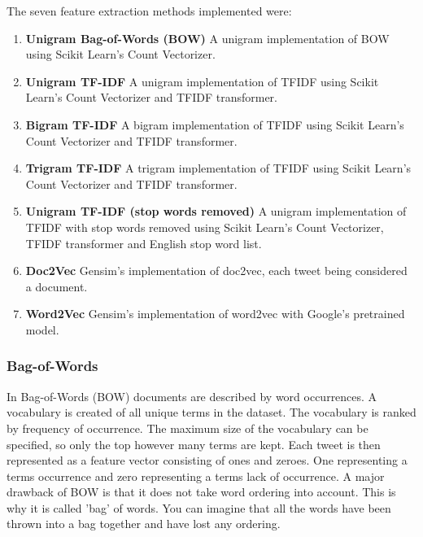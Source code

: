 The seven feature extraction methods implemented were:
\begin{enumerate}
    \item \textbf{Unigram Bag-of-Words (BOW)}\newline
    A unigram implementation of BOW using Scikit Learn's Count Vectorizer.
    \item \textbf{Unigram TF-IDF}\newline
    A unigram implementation of TFIDF using Scikit Learn's Count Vectorizer and TFIDF transformer.
    \item \textbf{Bigram TF-IDF}\newline
    A bigram implementation of TFIDF using Scikit Learn's Count Vectorizer and TFIDF transformer.
    \item \textbf{Trigram TF-IDF} \newline
    A trigram implementation of TFIDF using Scikit Learn's Count Vectorizer and TFIDF transformer.
    \item \textbf{Unigram TF-IDF (stop words removed)}\newline
    A unigram implementation of TFIDF with stop words removed using Scikit Learn's Count Vectorizer, TFIDF transformer and English stop word list.
    \item \textbf{Doc2Vec}\newline
    Gensim's implementation of doc2vec, each tweet being considered a document.
    \item \textbf{Word2Vec}\newline
    Gensim's implementation of word2vec with Google's pretrained model.
\end{enumerate}

\subsubsection{Bag-of-Words}

In Bag-of-Words (BOW) documents are described by word occurrences. A vocabulary is created of all unique terms in the dataset. The vocabulary is ranked by frequency of occurrence. The maximum size of the vocabulary can be specified, so only the top however many terms are kept. Each tweet is then represented as a feature vector consisting of ones and zeroes. One representing a terms occurrence and zero representing a terms lack of occurrence. A major drawback of BOW is that it does not take word ordering into account. This is why it is called 'bag' of words. You can imagine that all the words have been thrown into a bag together and have lost any ordering.

